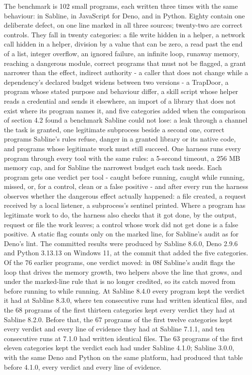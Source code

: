 \documentclass[
]{article}
\begin{document}
The benchmark is 102 small programs, each written three times with the
same behaviour: in Sabline, in JavaScript for Deno, and in Python.
Eighty contain one deliberate defect, on one line marked in all three
sources; twenty-two are correct controls. They fall in twenty
categories: a file write hidden in a helper, a network call hidden in a
helper, division by a value that can be zero, a read past the end of a
list, integer overflow, an ignored failure, an infinite loop, runaway
memory, reaching a dangerous module, correct programs that must not be
flagged, a grant narrower than the effect, indirect authority - a caller
that does not change while a dependency's declared budget widens between
two versions - a TrapDoor, a program whose stated purpose and behaviour
differ, a skill script whose helper reads a credential and sends it
elsewhere, an import of a library that does not exist where its program
names it, and five categories added when the comparison of section 4.2
found a benchmark Sabline could not lose: a leak through a channel the
task is granted, one legitimate subprocess beside a second one, correct
programs Sabline's rules refuse, danger in a granted library or its
native code, and programs whose legitimate work must still succeed. One
harness runs every program through every tool with the same rules: a
5-second timeout, a 256 MB memory cap, and for Sabline the narrowest
budget each task needs. Each program gets one verdict per tool - caught
before running, caught while running, missed, or, for a control, clean
or a false positive - and after every run the harness observes whether
the dangerous effect actually happened: a file created, a request
received by a local listener, a subprocess's sentinel printed. Where a
program has legitimate work to do, the harness also checks that it got
done, by the output, request or file the work leaves; a control whose
work did not get done is a false positive. A static flag counts only on
the marked line, for Sabline's audit as for Deno's lint. The committed
results were produced by Sabline 8.6.0, Deno 2.9.6 and Python 3.13.13 on
Windows 11, at the commit that added the five categories. Of the 76
earlier programs, one verdict moved: in 08f Sabline's audit flags the
loop that drives the memory growth, two helpers above the line that
grows, and under the marked-line rule that is no longer credited, so its
catch moved from before running to while running. At Sabline 8.4.0 every
program kept the verdict it had at Sabline 8.3.0, where ten consecutive
runs had written identical files, and the 68 programs of the first
thirteen categories kept every verdict they had at Sabline 8.2.0. Before
that, the 67 programs of the first twelve categories kept every verdict
and every line of evidence they had at Sabline 7.1.1, and ten
consecutive runs at 7.1.0 had written identical files. The 63 programs
of the first eleven categories kept the verdict each had under Sabline
4.1.0; Sabline 3.0.0, with the same Deno and Python on the same
platform, had produced that table before 4.1.0, every verdict and every
line of evidence.
\end{document}
